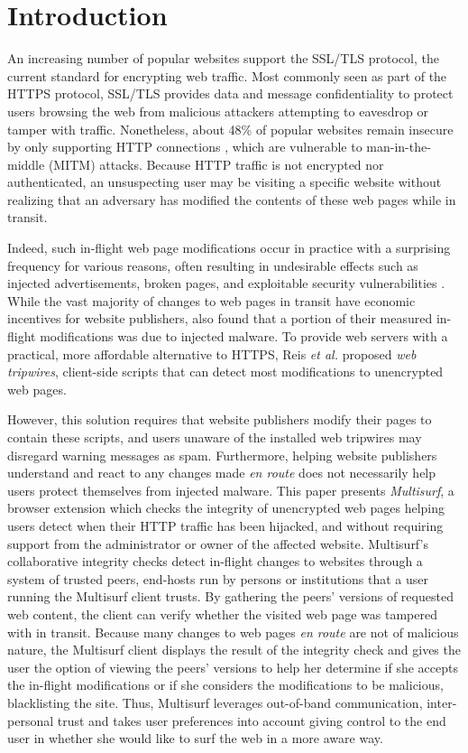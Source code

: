 \section{Introduction}
\label{sec:intro}

An increasing number of popular websites support the SSL/TLS protocol, the current standard for encrypting web traffic.
Most commonly seen as part of the HTTPS protocol, SSL/TLS provides data and message confidentiality to protect users browsing the web from malicious attackers attempting to eavesdrop or tamper with traffic. 
Nonetheless, about 48\% of popular websites remain insecure by only supporting HTTP connections \cite{sslpulse}, which are vulnerable to man-in-the-middle (MITM) attacks.
Because HTTP traffic is not encrypted nor authenticated, an unsuspecting user may be visiting a specific website without realizing that an adversary has modified the contents of these web pages while in transit.

Indeed, such in-flight web page modifications occur in practice with a surprising frequency for various reasons, often resulting in undesirable effects such as injected advertisements, broken pages, and exploitable security vulnerabilities \cite{tripwires}. 
While the vast majority of changes to web pages in transit have economic incentives for website publishers, \cite{tripwires} also found that a portion of their measured in-flight modifications was due to injected malware.
To provide web servers with a practical, more affordable alternative to HTTPS, Reis \emph{et al.} \cite{tripwires} proposed \emph{web tripwires}, client-side scripts that can detect most modifications to unencrypted web pages.

However, this solution requires that website publishers modify their pages to contain these scripts, and users unaware of the installed web tripwires may disregard warning messages as spam.
Furthermore, helping website publishers understand and react to any changes made \emph{en route} does not necessarily help users protect themselves from injected malware.
This paper presents \emph{Multisurf}, a browser extension which checks the integrity of unencrypted web pages helping users detect when their HTTP traffic has been hijacked, and without requiring support from the administrator or owner of the affected website. 
Multisurf's collaborative integrity checks detect in-flight changes to websites through a system of trusted peers, end-hosts run by persons or institutions that a user running the Multisurf client trusts. 
By gathering the peers' versions of requested web content, the client can verify whether the visited web page was tampered with in transit.
Because many changes to web pages \emph{en route} are not of malicious nature, the Multisurf client displays the result of the integrity check and gives the user the option of viewing the peers' versions to help her determine if she accepts the in-flight modifications or if she considers the modifications to be malicious, blacklisting the site. 
Thus, Multisurf leverages out-of-band communication, inter-personal trust and takes user preferences into account giving control to the end user in whether she would like to surf the web in a more aware way.

